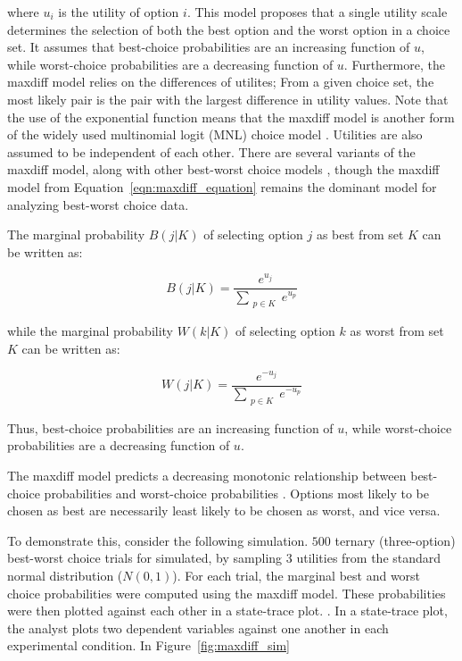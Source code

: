 where $u_{i}$ is the utility of option $i$. This model proposes that a single utility scale determines the selection of both the best option and the worst option in a choice set. It assumes that best-choice probabilities are an increasing function of $u$, while worst-choice probabilities are a decreasing function of $u$. Furthermore, the maxdiff model relies on the differences of utilites; From a given choice set, the most likely pair is the pair with the largest difference in utility values. Note that the use of the exponential function means that the maxdiff model is another form of the widely used multinomial logit (MNL) choice model \parencite{hausman1984specification}. Utilities are also assumed to be independent of each other.
There are several variants of the maxdiff model, along with other best-worst choice models \parencite{marleyProbabilisticModelsBest2005,marleyProbabilisticModelsSetdependent2008,marleyModelsBestWorst2012,flynnBestWorstScaling2007,flynn2014best}, though the maxdiff model from Equation~\ref{eqn:maxdiff_equation} remains the dominant model for analyzing best-worst choice data.

The marginal probability $B(j|K)$ of selecting option $j$ as best from set $K$ can be written as:

\begin{equation}
   B(j|K)=\frac{e^{u_{j}}}{\sum_{\substack{{p}\in K}} e^{u_{p}}}
\end{equation}

while the marginal probability $W(k|K)$ of selecting option $k$ as worst from set $K$ can be written as:

\begin{equation}
   W(j|K)=\frac{e^{-u_{j}}}{\sum_{\substack{{p}\in K}} e^{-u_{p}}}
\end{equation}

Thus, best-choice probabilities are an increasing function of $u$, while worst-choice probabilities are a decreasing function of $u$.

The maxdiff model predicts a decreasing monotonic relationship between best-choice probabilities and worst-choice probabilities \parencite{hawkinsBestTimesWorst2014}. Options most likely to be chosen as best are necessarily least likely to be chosen as worst, and vice versa. 

To demonstrate this, consider the following simulation. $500$ ternary (three-option) best-worst choice trials for simulated, by sampling 3 utilities from the standard normal distribution ($N(0,1)$). For each trial, the marginal best and worst choice probabilities were computed using the maxdiff model. These probabilities were then plotted against each other in a state-trace plot. \parencite{bamber1979state}. In a state-trace plot, the analyst plots two dependent variables against one another in each experimental condition. In Figure~\ref{fig:maxdiff_sim} 


